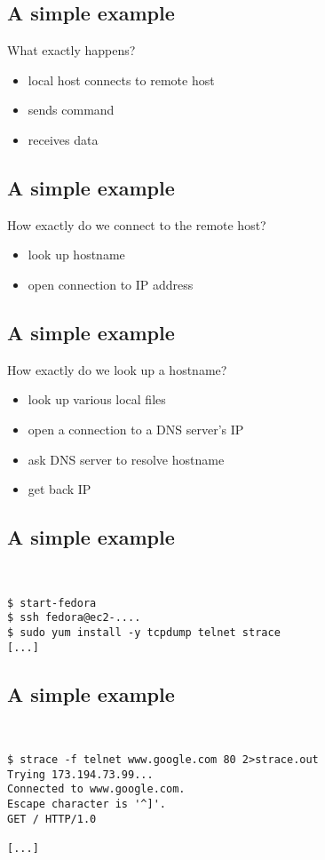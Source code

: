 \documentclass[xga]{xdvislides}
\begin{document}
\subsection{A simple example}
What exactly happens?
\\
\begin{itemize}
	\item local host connects to remote host
	\item sends command
	\item receives data
\end{itemize}

\subsection{A simple example}
How exactly do we connect to the remote host?
\\
\begin{itemize}
	\item look up hostname
	\item open connection to IP address
\end{itemize}

\subsection{A simple example}
How exactly do we look up a hostname?
\\
\begin{itemize}
	\item look up various local files
	\item open a connection to a DNS server's IP
	\item ask DNS server to resolve hostname
	\item get back IP
\end{itemize}

\subsection{A simple example}
\\
\Hugesize
\begin{center}
\begin{verbatim}
$ start-fedora
$ ssh fedora@ec2-....
$ sudo yum install -y tcpdump telnet strace
[...]
\end{verbatim}
\end{center}
\Normalsize
\vspace*{\fill}

\subsection{A simple example}
\\
\Hugesize
\begin{center}
\begin{verbatim}
$ strace -f telnet www.google.com 80 2>strace.out
Trying 173.194.73.99...
Connected to www.google.com.
Escape character is '^]'.
GET / HTTP/1.0

[...]
\end{verbatim}
\end{center}
\Normalsize
\vspace*{\fill}
\end{document}
